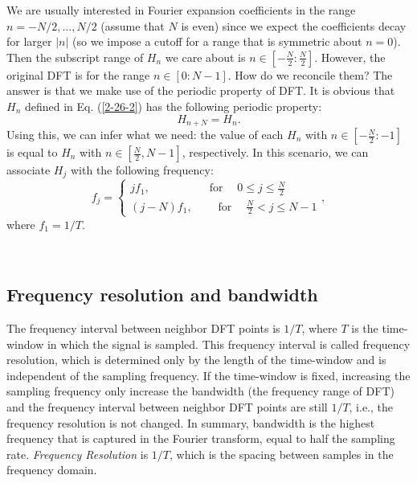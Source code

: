 \documentclass{article}
\newcommand{\tmem}[1]{{\em #1\/}}
\newcommand{\tmop}[1]{\ensuremath{\operatorname{#1}}}
\begin{document}
We are usually interested in Fourier expansion coefficients in the range $n =
- N / 2, \ldots, N / 2$ (assume that $N$ is even) since we expect the
coefficients decay for larger $| n |$ (so we impose a cutoff for a range that
is symmetric about $n = 0$). Then the subscript range of $H_n$ we care about
is $n \in \left[ - \frac{N}{2} : \frac{N}{2} \right]$. However, the original
DFT is for the range $n \in [0 : N - 1]$. How do we reconcile them? The answer
is that we make use of the periodic property of DFT. It is obvious that $H_n$
defined in Eq. (\ref{2-26-2}) has the following periodic property:
\begin{equation}
  \label{3-25-e1} H_{n + N} = H_n .
\end{equation}
Using this, we can infer what we need: the value of each $H_n$ with $n \in
\left[ - \frac{N}{2} : - 1 \right]$ is equal to $H_n$ with $n \in \left[
\frac{N}{2}, N - 1 \right]$, respectively. In this scenario, we can associate
$H_j$ with the following frequency:
\begin{equation}
  f_j = \left\{ \begin{array}{l}
    j f_1, \hspace{5em} \tmop{for} \quad 0 \leqslant j \leqslant \frac{N}{2}\\
    (j - N) f_1, \qquad \tmop{for} \quad  \frac{N}{2} < j \leqslant N - 1
  \end{array} \right.,
\end{equation}
where $f_1 = 1 / T$.

\

\subsection{Frequency resolution and bandwidth}

The frequency interval between neighbor DFT points is $1 / T$, where $T$ is
the time-window in which the signal is sampled. This frequency interval is
called frequency resolution, which is determined only by the length of the
time-window and is independent of the sampling frequency. If the time-window
is fixed, increasing the sampling frequency only increase the bandwidth (the
frequency range of DFT) and the frequency interval between neighbor DFT points
are still $1 / T$, i.e., the frequency resolution is not changed. In summary,
bandwidth is the highest frequency that is captured in the Fourier transform,
equal to half the sampling rate. {\tmem{Frequency Resolution}} is $1 / T$,
which is the spacing between samples in the frequency domain.
\end{document}
